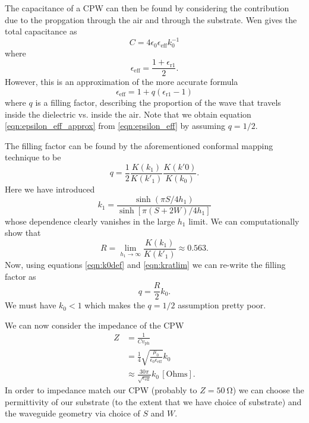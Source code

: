 \documentclass[a4paper]{article}
\begin{document}
The capacitance of a CPW can then be found by considering the contribution due
to the propgation through the air and through the substrate. Wen gives the
total capacitance as
\begin{equation}
  C = 4\epsilon_0\epsilon_\mathrm{eff} k_0^{-1}
\end{equation}
where
\begin{equation}
  \epsilon_\mathrm{eff} = \frac{1 + \epsilon_\mathrm{r1}}{2}.
  \label{eqn:epsilon_eff_approx}
\end{equation}
However, this is an approximation of the more accurate formula
\begin{equation}
  \epsilon_\mathrm{eff} = 1 + q(\epsilon_\mathrm{r1} - 1)
  \label{eqn:epsilon_eff}
\end{equation}
where $q$ is a filling factor, describing the proportion of the wave that
travels inside the dielectric vs. inside the air. Note that we obtain equation
\ref{eqn:epsilon_eff_approx} from \ref{eqn:epsilon_eff} by assuming $q = 1/2$.

The filling factor can be found by the aforementioned conformal mapping
technique to be
\begin{equation}
  q = \frac{1}{2}\frac{K(k_1)}{K(k'_1)}\frac{K(k'0)}{K(k_0)}.
  \label{eqn:fillfact}
\end{equation}
Here we have introduced
\begin{equation*}
  k_1 = \frac{\sinh (\pi S/ 4h_1)}{\sinh [\pi (S+2W)/4h_1]}
\end{equation*}
whose dependence clearly vanishes in the large $h_1$ limit. We can
computationally show that
\begin{equation}
  R = \lim_{h_1 \to \infty} \frac{K(k_1)}{K(k'_1)} \approx 0.563.
  \label{eqn:kratlim}
\end{equation}
Now, using equations \ref{eqn:k0def} and \ref{eqn:kratlim} we can re-write the
filling factor as
\begin{equation}
  q = \frac{R}{2}k_0.
\end{equation}
We must have $k_0 < 1$ which makes the $q=1/2$ assumption pretty poor.

We can now consider the impedance of the CPW
\begin{align}
  Z &= \frac{1}{C v_\mathrm{ph}} \\
    &= \frac{1}{4}\sqrt{\frac{\mu_0}{\epsilon_0 \epsilon_\mathrm{eff}}}k_0 \\
    &\approx \frac{30\pi}{\sqrt{\epsilon_\mathrm{eff}}}k_0 \, \mathrm{[Ohms]}.
\end{align}
In order to impedance match our CPW (probably to $Z=\SI{50}{\ohm}$) we can choose
the permittivity of our substrate (to the extent that we have choice of
substrate) and the waveguide geometry via choice of $S$ and $W$.
\end{document}
